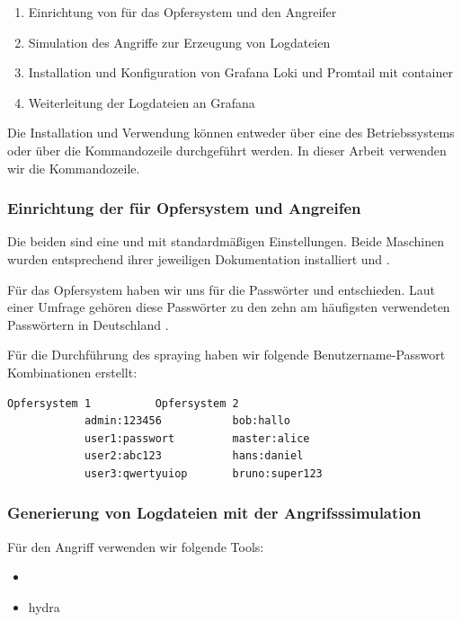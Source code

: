 \begin{enumerate}[noitemsep]
   \item Einrichtung von  für das Opfersystem und den Angreifer
   \item Simulation des Angriffe zur Erzeugung von Logdateien
   \item Installation und Konfiguration von Grafana Loki und Promtail mit \gls{container}
   \item Weiterleitung der Logdateien an Grafana
   \end{enumerate}

Die Installation und Verwendung können entweder über eine  des Betriebssystems oder über die Kommandozeile durchgeführt werden. In dieser Arbeit verwenden wir die Kommandozeile.

\subsubsection{Einrichtung der  für Opfersystem und Angreifen}
Die beiden  sind eine  und  mit standardmäßigen Einstellungen. Beide Maschinen wurden entsprechend ihrer jeweiligen Dokumentation installiert \citep{kali_vm} und \citep{Ubuntu_server}.

Für das Opfersystem haben wir uns für die Passwörter  und  entschieden. Laut einer Umfrage gehören diese Passwörter zu den zehn am häufigsten verwendeten Passwörtern in Deutschland \citep{silicon_passwort}.

Für die Durchführung des \gls{spraying} haben wir folgende Benutzername-Passwort Kombinationen erstellt:

{
\begin{lstlisting}[frame=single]
            Opfersystem 1          Opfersystem 2  
            admin:123456           bob:hallo
            user1:passwort         master:alice
            user2:abc123           hans:daniel
            user3:qwertyuiop       bruno:super123
\end{lstlisting}
}

\newpage
\subsubsection{Generierung von Logdateien mit der Angrifsssimulation}
Für den Angriff verwenden wir folgende Tools:

{
\begin{itemize}[noitemsep]
   \item	{}
   \item \gls{hydra}
\end{itemize}
}

